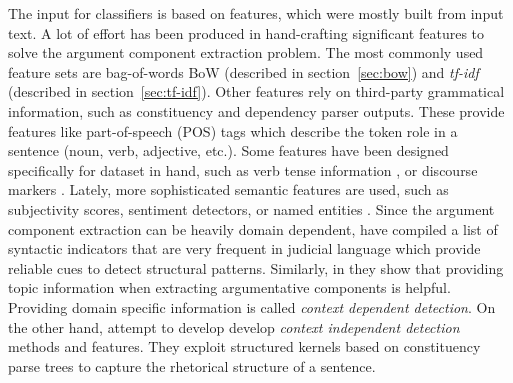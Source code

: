 The input for classifiers is based on features, which were mostly built from
input text.  A lot of effort has been produced in hand-crafting significant
features to solve the argument component extraction problem.  The most commonly
used feature sets are bag-of-words BoW (described in section~\ref{sec:bow}) and
\emph{tf-idf} (described in section~\ref{sec:tf-idf}). Other features rely on
third-party grammatical information, such as constituency and dependency parser
outputs. These provide features like part-of-speech (POS) tags
\citep{manning2011part} which describe the token role in a sentence (noun,
verb, adjective, etc.).
Some features have been designed specifically for dataset in hand, such as verb
tense information \citep{palau2009argumentation, stab2014identifying}, or
discourse markers \citep{eckle2015role}. Lately, more sophisticated semantic
features are used,
such as subjectivity scores, sentiment detectors, or named entities \citep{levy2014context}.  
Since the argument component
extraction can be heavily domain dependent, \citet{palau2009argumentation} have
compiled a list of syntactic indicators that are very frequent in judicial
language which provide reliable cues to detect structural patterns. Similarly,
in \citep{levy2014context, rinott2015show} they show that providing topic
information when extracting argumentative components is helpful. Providing domain
specific information is called \emph{context dependent detection}. On the other
hand, \citep{lippi2015context} attempt to develop develop \emph{context independent
detection} methods and features. They exploit structured kernels based on
constituency parse trees to capture the rhetorical structure of a sentence. 

